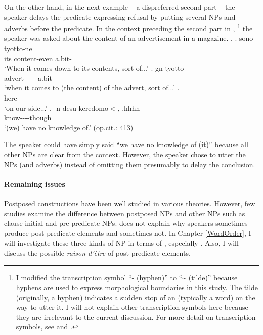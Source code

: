 On the other hand, in the next example -- a dispreferred second part --
the speaker delays the predicate expressing refusal
by putting several NPs and adverbs before the predicate.
In the context preceding the second part in \Next,%
 \footnote{
 I modified the transcription symbol ``- (hyphen)'' to ``{\textasciitilde} (tilde)'' because hyphens are used to express morphological boundaries in this study.
 The tilde (originally, a hyphen) indicates a sudden stop of an  (typically a word) on the way to utter it.
 I will not explain other transcription symbols here because
 they are irrelevant to the current discussion.
 For more detail on transcription symbols,
 see  and .
 }
the speaker was asked about the content of an advertisement in a magazine.
%
\ex.
 \ag. sono  tyotto-ne \\
      its \hspace{0.2cm}content-even a.bit- \\
      `When it comes down to its contents, sort of...'
 \bg.  gn  tyotto \\
      advert-  --- a.bit \\
      `when it comes to (the content) of the advert, sort of...'
 \bg.  \\
      here-- \\
      `on our side...'
 \bg. -n-desu-keredomo$<$, .hhhh \\
      know----though \\
      `(we) have no knowledge of.'
      \hfill{(op.cit.: 413)}

The speaker could have simply said ``we have no knowledge of (it)''
because all other NPs are clear from the context.
However, the speaker chose to utter the NPs (and adverbs) instead of omitting them presumably to delay the conclusion.

\paragraph{Remaining issues}

Postposed constructions have been well studied in various theories.
However, few studies examine the difference between postposed NPs and
other NPs such as clause-initial and pre-predicate NPs.
 does not explain why speakers sometimes produce
post-predicate elements and sometimes not.
In Chapter \ref{WordOrder},
I will investigate these three kinds of NP in terms of ,
especially .
Also, I will discuss the possible \emph{raison d'{\^{e}}tre} of post-predicate elements.

